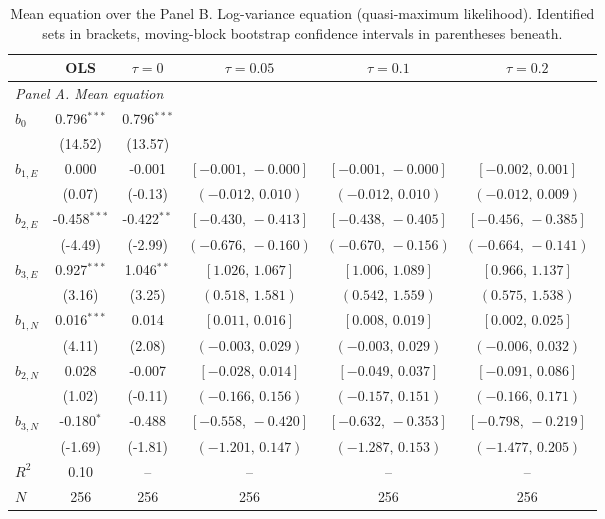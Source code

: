 \begin{table}[!htbp]
\centering
\begin{threeparttable}
\caption{Mean equation over the Panel B. Log-variance equation (quasi-maximum likelihood). Identified sets in brackets, moving-block bootstrap confidence intervals in parentheses beneath.}
\label{tab:log_var_eq_panel_ppml}
\scriptsize\setlength{\tabcolsep}{3pt}
\begin{tabular}{lccccc}
\toprule
 & OLS & $\tau{=}0$ & $\tau{=}0.05$ & $\tau{=}0.1$ & $\tau{=}0.2$ \\
\midrule
\multicolumn{6}{l}{\textit{Panel A. Mean equation}} \\
\midrule
$b_0$ & 0.796$^{***}$ & 0.796$^{***}$ &  &  &  \\
 & (14.52) & (13.57) &  &  &  \\
$b_{1,E}$ & 0.000 & -0.001 & $[-0.001,\,-0.000]$ & $[-0.001,\,-0.000]$ & $[-0.002,\,0.001]$ \\
 & (0.07) & (-0.13) & $(-0.012,\,0.010)$ & $(-0.012,\,0.010)$ & $(-0.012,\,0.009)$ \\
$b_{2,E}$ & -0.458$^{***}$ & -0.422$^{**}$ & $[-0.430,\,-0.413]$ & $[-0.438,\,-0.405]$ & $[-0.456,\,-0.385]$ \\
 & (-4.49) & (-2.99) & $(-0.676,\,-0.160)$ & $(-0.670,\,-0.156)$ & $(-0.664,\,-0.141)$ \\
$b_{3,E}$ & 0.927$^{***}$ & 1.046$^{**}$ & $[1.026,\,1.067]$ & $[1.006,\,1.089]$ & $[0.966,\,1.137]$ \\
 & (3.16) & (3.25) & $(0.518,\,1.581)$ & $(0.542,\,1.559)$ & $(0.575,\,1.538)$ \\
\midrule
$b_{1,N}$ & 0.016$^{***}$ & 0.014 & $[0.011,\,0.016]$ & $[0.008,\,0.019]$ & $[0.002,\,0.025]$ \\
 & (4.11) & (2.08) & $(-0.003,\,0.029)$ & $(-0.003,\,0.029)$ & $(-0.006,\,0.032)$ \\
$b_{2,N}$ & 0.028 & -0.007 & $[-0.028,\,0.014]$ & $[-0.049,\,0.037]$ & $[-0.091,\,0.086]$ \\
 & (1.02) & (-0.11) & $(-0.166,\,0.156)$ & $(-0.157,\,0.151)$ & $(-0.166,\,0.171)$ \\
$b_{3,N}$ & -0.180$^{*}$ & -0.488 & $[-0.558,\,-0.420]$ & $[-0.632,\,-0.353]$ & $[-0.798,\,-0.219]$ \\
 & (-1.69) & (-1.81) & $(-1.201,\,0.147)$ & $(-1.287,\,0.153)$ & $(-1.477,\,0.205)$ \\
\midrule
$R^2$ & 0.10 & -- & -- & -- & -- \\
$N$ & 256 & 256 & 256 & 256 & 256 \\

\end{tabular}
\end{threeparttable}
\end{table}
